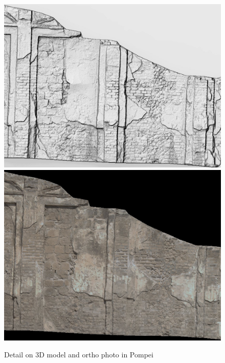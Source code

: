 \begin{figure}
\centering
\includegraphics[width=160mm]{FIGS/SAMPLES/Pompei-Shade1.jpg}
\includegraphics[width=160mm]{FIGS/SAMPLES/Pompei-Ortho2.jpg}
\caption{Detail on 3D model and ortho photo in Pompei}
\end{figure}


